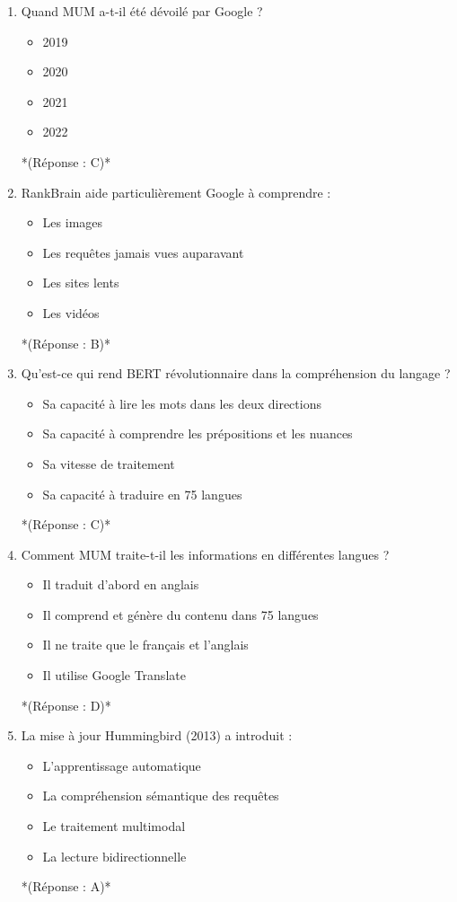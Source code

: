 \documentclass[12pt,a4paper,twoside]{report}
\begin{document}
\begin{enumerate}
\item Quand MUM a-t-il été dévoilé par Google ?
\begin{itemize}
\item[A)] 2019
\item[B)] 2020
\item[C)] 2021
\item[D)] 2022
\end{itemize}
*(Réponse : C)*

\item RankBrain aide particulièrement Google à comprendre :
\begin{itemize}
\item[A)] Les images
\item[B)] Les requêtes jamais vues auparavant
\item[C)] Les sites lents
\item[D)] Les vidéos
\end{itemize}
*(Réponse : B)*

\item Qu'est-ce qui rend BERT révolutionnaire dans la compréhension du langage ?
\begin{itemize}
\item[A)] Sa capacité à lire les mots dans les deux directions
\item[B)] Sa capacité à comprendre les prépositions et les nuances
\item[C)] Sa vitesse de traitement
\item[D)] Sa capacité à traduire en 75 langues
\end{itemize}
*(Réponse : C)*

\item Comment MUM traite-t-il les informations en différentes langues ?
\begin{itemize}
\item[A)] Il traduit d'abord en anglais
\item[B)] Il comprend et génère du contenu dans 75 langues
\item[C)] Il ne traite que le français et l'anglais
\item[D)] Il utilise Google Translate
\end{itemize}
*(Réponse : D)*

\item La mise à jour Hummingbird (2013) a introduit :
\begin{itemize}
\item[A)] L'apprentissage automatique
\item[B)] La compréhension sémantique des requêtes
\item[C)] Le traitement multimodal
\item[D)] La lecture bidirectionnelle
\end{itemize}
*(Réponse : A)*


\end{enumerate}
\end{document}
